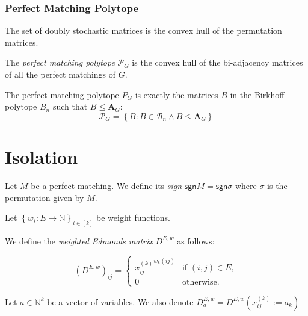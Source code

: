 \documentclass{beamer}
\theoremstyle{remark}
\newcommand{\nn}{\mathbb{N}}
\newcommand{\birk}{\mathcal{B}}
\newcommand{\biadj}[1]{\mathbf{A}_{#1}}
\newcommand{\pmatch}{\mathcal{P}}
\newcommand{\setcomp}[1]{\left\{#1\right\}}
\newcommand{\sgn}{\mathsf{sgn}}
\begin{document}
\begin{frame}
  \frametitle{Perfect Matching Polytope}
  \begin{theorem}[Birkhoff, 1946]
    The set of doubly stochastic matrices is the convex hull of the
    permutation matrices.
  \end{theorem}

  \begin{definition}
    The \emph{perfect matching polytope} $\pmatch_G$ is the convex hull of
    the bi-adjacency matrices of all the perfect matchings of $G$.
  \end{definition}

  \begin{corollary}
    The perfect matching polytope $P_G$ is exactly the matrices $B$ in
    the Birkhoff polytope $B_n$ such that $B \le \biadj{G}$:
    \[
      \pmatch_G = \setcomp{B : B \in \birk_n \wedge B \le \biadj{G}}
    \]
  \end{corollary}
\end{frame}

\section{Isolation}
\begin{frame}[allowframebreaks]
  \begin{definition}
    Let $M$ be a perfect matching.
    We define its \emph{sign} $\sgn M = \sgn \sigma$ where $\sigma$
    is the permutation given by $M$.
  \end{definition}
  \begin{definition}
    Let ${\left\{w_i : E \to \nn \right\}}_{i \in [k]}$ be weight functions.

    We define the \emph{weighted Edmonds matrix} $D^{E,w}$ as follows:

    \[
      {\left(D^{E,w}\right)}_{ij} =
      \begin{cases}
        {x_{ij}^{(k)}}^{w_k(ij)} & \text{if } (i, j) \in E, \\
        0            & \text{otherwise}.
      \end{cases}
    \]

    Let $a \in \nn^k$ be a vector of variables.
    We also denote $D_a^{E,w} = D^{E,w}(x_{ij}^{(k)} := a_k)$
  \end{definition}
\end{frame}
\end{document}
